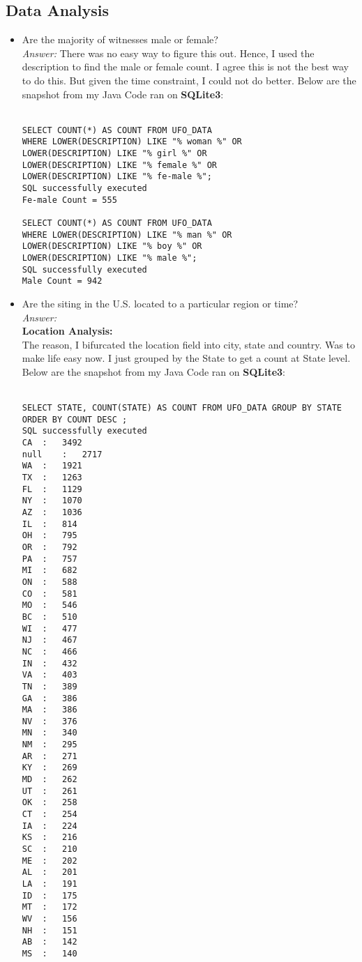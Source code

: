 \documentclass{article}
\begin{document}
\subsection*{Data Analysis}
\begin{itemize}
	\renewcommand{\labelitemi}{$\bullet$}
\item Are the majority of witnesses male or female?\\
\emph{Answer:} There was no easy way to figure this out. Hence, I used the description to find the male or female count. I agree this is not the best way to do this. But given the time constraint, I could not do better. Below are the snapshot from my Java Code ran on \textbf{SQLite3}:\\ \\
\begin{BVerbatim}
SELECT COUNT(*) AS COUNT FROM UFO_DATA 
WHERE LOWER(DESCRIPTION) LIKE "%
LOWER(DESCRIPTION) LIKE "%
LOWER(DESCRIPTION) LIKE "%
LOWER(DESCRIPTION) LIKE "%
SQL successfully executed
Fe-male Count = 555

SELECT COUNT(*) AS COUNT FROM UFO_DATA 
WHERE LOWER(DESCRIPTION) LIKE "%
LOWER(DESCRIPTION) LIKE "%
LOWER(DESCRIPTION) LIKE "%
SQL successfully executed
Male Count = 942
\end{BVerbatim}

\item Are the siting in the U.S. located to a particular region or time?\\
\emph{Answer:}\\ \textbf{Location Analysis:} \\
The reason, I bifurcated the location field into city, state and country. Was to make life easy now. I just grouped by the State to get a count at State level. Below are the snapshot from my Java Code ran on \textbf{SQLite3}: \\ \\
\begin{BVerbatim}
SELECT STATE, COUNT(STATE) AS COUNT FROM UFO_DATA GROUP BY STATE ORDER BY COUNT DESC ;
SQL successfully executed
CA	:	3492
null	:	2717
WA	:	1921
TX	:	1263
FL	:	1129
NY	:	1070
AZ	:	1036
IL	:	814
OH	:	795
OR	:	792
PA	:	757
MI	:	682
ON	:	588
CO	:	581
MO	:	546
BC	:	510
WI	:	477
NJ	:	467
NC	:	466
IN	:	432
VA	:	403
TN	:	389
GA	:	386
MA	:	386
NV	:	376
MN	:	340
NM	:	295
AR	:	271
KY	:	269
MD	:	262
UT	:	261
OK	:	258
CT	:	254
IA	:	224
KS	:	216
SC	:	210
ME	:	202
AL	:	201
LA	:	191
ID	:	175
MT	:	172
WV	:	156
NH	:	151
AB	:	142
MS	:	140
\end{BVerbatim}


\end{itemize}
\end{document}
